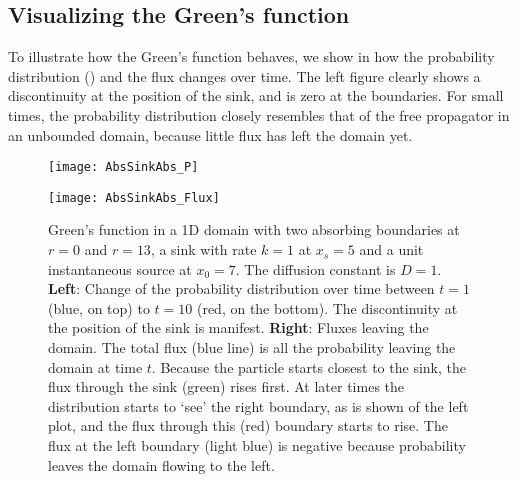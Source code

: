 \subsection{Visualizing the Green's function}
To illustrate how the Green's function behaves, we show in  how the probability distribution () and the flux changes over time. The left figure clearly shows a discontinuity at the position of the sink, and is zero at the boundaries. For small times, the probability distribution closely resembles that of the free propagator in an unbounded domain, because little flux has left the domain yet.

\begin{figure}[ht]
\begin{minipage}[ht]{.5\linewidth}
\centering
\texttt{[image: AbsSinkAbs\_P]}
\end{minipage}
\begin{minipage}[ht]{.5\linewidth}
\centering
\texttt{[image: AbsSinkAbs\_Flux]}
\end{minipage}
\caption{ Green's function in a 1D domain with two absorbing boundaries at $r=0$ and $r=13$, a sink with rate $k=1$ at $x_s=5$ and a unit instantaneous source at $x_0=7$. The diffusion constant is $D=1$. {\bf Left}: Change of the probability distribution over time between $t=1$ (blue, on top) to $t=10$ (red, on the bottom). The discontinuity at the position of the sink is manifest. {\bf Right}: Fluxes leaving the domain. The total flux (blue line) is all the probability leaving the domain at time $t$. Because the particle starts closest to the sink, the flux through the sink (green) rises first. At later times the distribution starts to `see' the right boundary, as is shown of the left plot, and the flux through this (red) boundary starts to rise. The flux at the left boundary (light blue) is negative because probability leaves the domain flowing to the left. 
}
\end{figure}

